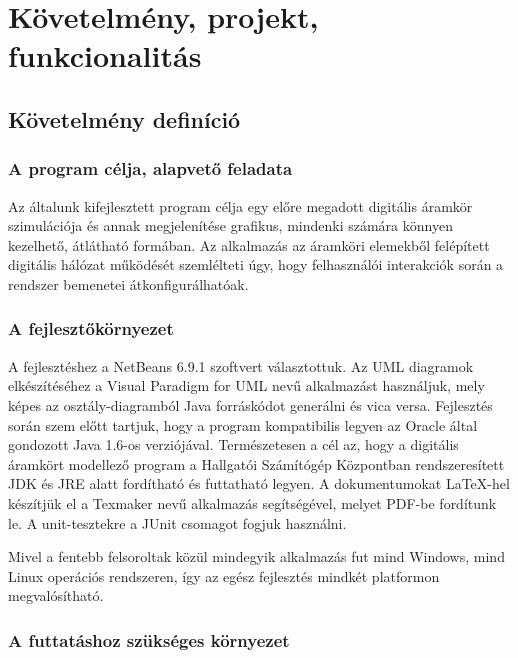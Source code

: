%
\chapter{Követelmény, projekt, funkcionalitás}

\thispagestyle{fancy}

\section{Követelmény definíció}
\label{sec:reqdef}

\subsection{A program célja, alapvető feladata}

Az általunk kifejlesztett program célja egy előre megadott digitális áramkör szimulációja és annak megjelenítése grafikus, mindenki számára könnyen kezelhető, átlátható formában. Az alkalmazás az áramköri elemekből felépített digitális hálózat működését szemlélteti úgy, hogy felhasználói interakciók során a rendszer bemenetei átkonfigurálhatóak.

\subsection{A fejlesztőkörnyezet}
\label{sec:devenvironment}

A fejlesztéshez a NetBeans 6.9.1 szoftvert választottuk. Az UML diagramok elkészítéséhez a Visual Paradigm for UML nevű alkalmazást használjuk, mely képes az osztály-diagramból Java forráskódot generálni és vica versa. Fejlesztés során szem előtt tartjuk, hogy a program kompatibilis legyen az Oracle által gondozott Java 1.6-os verziójával. Természetesen a cél az, hogy a digitális áramkört modellező program a Hallgatói Számítógép Központban rendszeresített JDK és JRE alatt fordítható és futtatható legyen. A dokumentumokat \LaTeX{}-hel készítjük el a Texmaker nevű alkalmazás segítségével, melyet PDF-be fordítunk le. A unit-tesztekre a JUnit csomagot fogjuk használni.

Mivel a fentebb felsoroltak közül mindegyik alkalmazás fut mind Windows, mind Linux operációs rend\-szeren, így az egész fejlesztés mindkét platformon megvalósítható.

\subsection{A futtatáshoz szükséges környezet}


